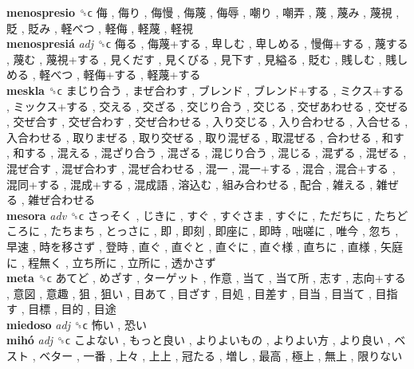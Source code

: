 \textbf{menospresio} ␝ϲ   侮 ,  侮り ,  侮慢 ,  侮蔑 ,  侮辱 ,  嘲り ,  嘲弄 ,  蔑 ,  蔑み ,  蔑視 ,  貶 ,  貶み ,  軽べつ ,  軽侮 ,  軽蔑 ,  軽視   \\
\textbf{menospresiá} \emph{adj}  ␝ϲ   侮る ,  侮蔑+する ,  卑しむ ,  卑しめる ,  慢侮+する ,  蔑する ,  蔑む ,  蔑視+する ,  見くだす ,  見くびる ,  見下す ,  見縊る ,  貶む ,  賎しむ ,  賎しめる ,  軽べつ ,  軽侮+する ,  軽蔑+する   \\
\textbf{meskla} ␝ϲ   まじり合う ,  まぜ合わす ,  ブレンド ,  ブレンド+する ,  ミクス+する ,  ミックス+する ,  交える ,  交ざる ,  交じり合う ,  交じる ,  交ぜあわせる ,  交ぜる ,  交ぜ合す ,  交ぜ合わす ,  交ぜ合わせる ,  入り交じる ,  入り合わせる ,  入合せる ,  入合わせる ,  取りまぜる ,  取り交ぜる ,  取り混ぜる ,  取混ぜる ,  合わせる ,  和す ,  和する ,  混える ,  混ざり合う ,  混ざる ,  混じり合う ,  混じる ,  混ずる ,  混ぜる ,  混ぜ合す ,  混ぜ合わす ,  混ぜ合わせる ,  混一 ,  混一+する ,  混合 ,  混合+する ,  混同+する ,  混成+する ,  混成語 ,  溶込む ,  組み合わせる ,  配合 ,  雑える ,  雑ぜる ,  雑ぜ合わせる   \\
\textbf{mesora} \emph{adv}  ␝ϲ   さっそく ,  じきに ,  すぐ ,  すぐさま ,  すぐに ,  ただちに ,  たちどころに ,  たちまち ,  とっさに ,  即 ,  即刻 ,  即座に ,  即時 ,  咄嗟に ,  唯今 ,  忽ち ,  早速 ,  時を移さず ,  登時 ,  直ぐ ,  直ぐと ,  直ぐに ,  直ぐ様 ,  直ちに ,  直様 ,  矢庭に ,  程無く ,  立ち所に ,  立所に ,  透かさず   \\
\textbf{meta} ␝ϲ   あてど ,  めざす ,  ターゲット ,  作意 ,  当て ,  当て所 ,  志す ,  志向+する ,  意図 ,  意趣 ,  狙 ,  狙い ,  目あて ,  目ざす ,  目処 ,  目差す ,  目当 ,  目当て ,  目指す ,  目標 ,  目的 ,  目途   \\
\textbf{miedoso} \emph{adj}  ␝ϲ   怖い ,  恐い   \\
\textbf{mihó} \emph{adj}  ␝ϲ   こよない ,  もっと良い ,  よりよいもの ,  よりよい方 ,  より良い ,  ベスト ,  ベター ,  一番 ,  上々 ,  上上 ,  冠たる ,  増し ,  最高 ,  極上 ,  無上 ,  限りない   \\

